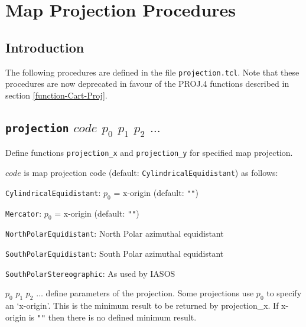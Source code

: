 
\section{Map Projection Procedures}
    \label{projection}

\subsection{Introduction}
    \label{projection-Introduction}

The following procedures are defined in the file 
  \texttt{projection.tcl}.
Note that these procedures are now deprecated in favour of the PROJ.4 functions described in
section \ref{function-Cart-Proj}.

\subsection{\texttt{projection} $\mathit{code}$ $p_0$ $p_1$ $p_2$ $\ldots$}

Define functions 
  \texttt{projection\_x} and 
  \texttt{projection\_y} for specified map projection.
  


  $\mathit{code}$ is map projection code (default: 
  \texttt{CylindricalEquidistant}) as follows:
\begin{bullets}
    \item 
    \texttt{CylindricalEquidistant}: 
    $p_0$ = x-origin (default: 
    \texttt{""})
    \item 
    \texttt{Mercator}: 
    $p_0$ = x-origin (default: 
    \texttt{""})
    \item 
    \texttt{NorthPolarEquidistant}: North Polar azimuthal
    equidistant
    \item 
    \texttt{SouthPolarEquidistant}: South Polar azimuthal
    equidistant
    \item 
    \texttt{SouthPolarStereographic}: As used by IASOS
\end{bullets}

  $p_0$ 
  $p_1$ 
  $p_2$ $\ldots$ define parameters of the projection. Some
  projections use 
  $p_0$ to specify an `x-origin'. This is the minimum
  result to be returned by projection\_x. If x-origin is 
  \texttt{""} then there is no defined minimum
  result.
